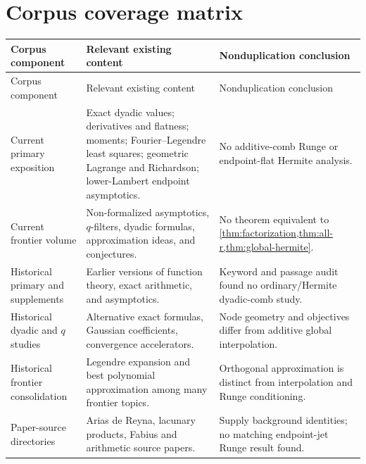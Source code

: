 \documentclass[11pt,oneside]{article}
\theoremstyle{definition}
\theoremstyle{remark}
\begin{document}
\section{Corpus coverage matrix}
\label{app:corpus}

\begin{longtable}{@{}p{}p{}p{}@{}}
\toprule
Corpus component & Relevant existing content & Nonduplication conclusion\\
\midrule
\endfirsthead
\toprule
Corpus component & Relevant existing content & Nonduplication conclusion\\
\midrule
\endhead
Current primary exposition & Exact dyadic values; derivatives and flatness; moments; Fourier--Legendre least squares; geometric Lagrange and Richardson; lower-Lambert endpoint asymptotics. & No additive-comb Runge or endpoint-flat Hermite analysis.\\
Current frontier volume & Non-formalized asymptotics, $q$-filters, dyadic formulas, approximation ideas, and conjectures. & No theorem equivalent to \cref{thm:factorization,thm:all-r,thm:global-hermite}.\\
Historical primary and supplements & Earlier versions of function theory, exact arithmetic, and asymptotics. & Keyword and passage audit found no ordinary/Hermite dyadic-comb study.\\
Historical dyadic and $q$ studies & Alternative exact formulas, Gaussian coefficients, convergence accelerators. & Node geometry and objectives differ from additive global interpolation.\\
Historical frontier consolidation & Legendre expansion and best polynomial approximation among many frontier topics. & Orthogonal approximation is distinct from interpolation and Runge conditioning.\\
Paper-source directories & Arias de Reyna, lacunary products, Fabius and arithmetic source papers. & Supply background identities; no matching endpoint-jet Runge result found.\\
\bottomrule
\end{longtable}
\end{document}

